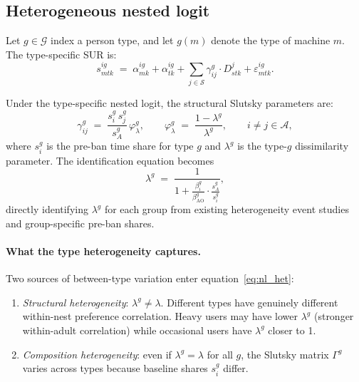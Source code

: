 \documentclass{article}
\begin{document}
\subsection{Heterogeneous nested logit}

Let $g \in \mathcal{G}$ index a person type, and let
$g(m)$ denote the type of machine $m$.  The type-specific SUR is:
\begin{equation}\label{eq:sur_het}
  s_{mtk}^{ig} \;=\; \alpha_{mk}^{ig} + \alpha_{tk}^{ig}
  + \sum_{j \in \mathcal{S}} \gamma_{ij}^g \cdot D_{stk}^j
  + \varepsilon_{mtk}^{ig}.
\end{equation}

Under the type-specific nested logit, the structural Slutsky parameters are:
\begin{equation}\label{eq:nl_het}
  \gamma_{ij}^g \;=\; \frac{s_i^g\, s_j^g}{s_A^g}\,\varphi_\lambda^g,
  \qquad
  \varphi_\lambda^g \;=\; \frac{1-\lambda^g}{\lambda^g},
  \qquad i \neq j \in \mathcal{A},
\end{equation}
where $s_i^g$ is the pre-ban time share for type $g$ and $\lambda^g$ is the
type-$g$ dissimilarity parameter.  The identification equation becomes
\begin{equation}\label{eq:lambda_het}
  \lambda^g \;=\; \frac{1}{1 + \displaystyle\frac{\beta_i^g}{\beta_{\mathrm{AO}}^g}
    \cdot \frac{s_A^g}{s_i^g}},
\end{equation}
directly identifying $\lambda^g$ for each group from existing heterogeneity
event studies and group-specific pre-ban shares.

\paragraph{What the type heterogeneity captures.}  Two sources of
between-type variation enter equation~\eqref{eq:nl_het}:
\begin{enumerate}
  \item \emph{Structural heterogeneity}: $\lambda^g \neq \lambda$.  Different
    types have genuinely different within-nest preference correlation.  Heavy
    users may have lower $\lambda^g$ (stronger within-adult correlation) while
    occasional users have $\lambda^g$ closer to 1.
  \item \emph{Composition heterogeneity}: even if $\lambda^g = \lambda$
    for all $g$, the Slutsky matrix $\Gamma^g$ varies across types because
    baseline shares $s_i^g$ differ.
\end{enumerate}
\end{document}
